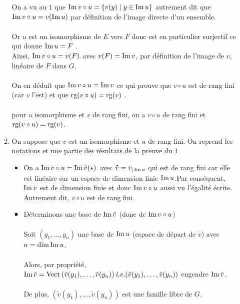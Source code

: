 \begin{dem}
\begin{itemize}
\begin{enumerate}
                On a vu au \(1\) que \(\operatorname{Im} v \circ u = \left\lbrace v(y) \;\middle|\; y \in  \operatorname{Im} u\right\rbrace\) autrement dit que \(\operatorname{Im} v \circ u = v (\operatorname{Im} u)\) par définition de l’image directe d’un ensemble.\\~\\
                Or \(u\) est un isomorphisme de \(E\) vers \(F\) donc est en particulier surjectif ce qui donne \(\operatorname{Im} u = F\) .\\
                Ainsi, \(\operatorname{Im} v \circ u = v (F )\) avec \(v (F ) = \operatorname{Im} v\), par définition de l’image de \(v\), linéaire de \(F\) dans \(G\).\\~\\
                On en déduit que \(\operatorname{Im} v \circ u = \operatorname{Im} v\) ce qui prouve que \(v \circ u\) est de rang fini (car \(v\) l’est) et que \(\operatorname{rg} (v \circ u) = \operatorname{rg} (v)\) .\\~\\
                \conclusion pour \(u\) isomorphisme et \(v\) de rang fini, on a \(v \circ u\) de rang fini et \(\operatorname{rg} (v \circ u) =\operatorname{rg} (v)\).
            \item On suppose que \(v\) est un isomorphisme et \(u\) de rang fini.
                On reprend les notations et une partie des résultats de la preuve du \(1\)
                \begin{itemize}
                    \item On a \(\operatorname{Im} v \circ u = \operatorname{Im}\tilde{v}(\star)\) avec \(\tilde{v} = v_{|\operatorname{Im} u}\) qui est de rang fini car elle est linéaire sur un espace de dimension finie \(\operatorname{Im} u\).Par conséquent, \(\operatorname{Im} \tilde{v}\) est de dimension finie et donc \(\operatorname{Im} v \circ u\) aussi vu l’égalité écrite. Autrement dit, \(v \circ u\) est de rang fini.
                    \item Déterminons une base de \(\operatorname{Im} \tilde{v}\) (donc de \(\operatorname{Im} v \circ u\))\\~\\
                    Soit \((y_1, \dots , y_n)\) une base de \(\operatorname{Im} u\) (espace de départ de \(\tilde{v}\)) avec \(n = \dim \operatorname{Im} u\).\\~\\
                    Alors, par propriété, \(\im \tilde{v} = \Vect{\tilde{v}(y_1), \dots , \tilde{v}(y_n)} \ie (\tilde{v}(y_1), \dots , \tilde{v}(y_n))\) engendre \(\operatorname{Im} \tilde{v}\).\\~\\
                    De plus, \((\tilde{v}(y_1), \dots , \tilde{v}(y_n))\) est une famille libre de \(G\).\\~\\

\end{itemize}
\end{enumerate}
\end{itemize}
\end{dem}
